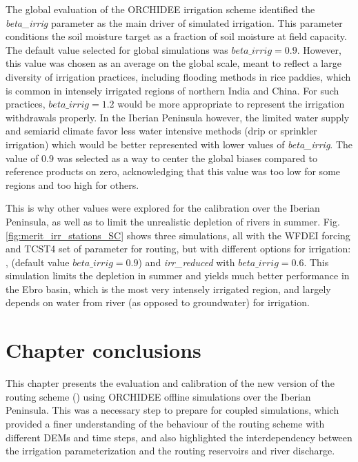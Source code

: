The global evaluation of the ORCHIDEE irrigation scheme \citep{arboleda-obando_validation_2024} identified the \textit{beta\_irrig} parameter as the main driver of simulated irrigation. This parameter conditions the soil moisture target as a fraction of soil moisture at field capacity. The default value selected for global simulations was $beta\_irrig = 0.9$. However, this value was chosen as an average on the global scale, meant to reflect a large diversity of irrigation practices, including flooding methods in rice paddies, which is common in intensely irrigated regions of northern India and China. For such practices, $beta\_irrig = 1.2$ would be more appropriate to represent the irrigation withdrawals properly. In the Iberian Peninsula however, the limited water supply and semiarid climate favor less water intensive methods (drip or sprinkler irrigation) which would be better represented with lower values of \textit{beta\_irrig}. The value of $0.9$ was selected as a way to center the global biases compared to reference products on zero, acknowledging that this value was too low for some regions and too high for others.

This is why other values were explored for the calibration over the Iberian Peninsula, as well as to limit the unrealistic depletion of rivers in summer. Fig. \ref{fig:merit_irr_stations_SC} shows three simulations, all with the WFDEI forcing and TCST4 set of parameter for routing, but with different options for irrigation: \noirr, \irr (default value $beta\_irrig = 0.9$) and \textit{irr\_reduced} with $beta\_irrig = 0.6$. 
This simulation limits the depletion in summer and yields much better performance in the Ebro basin, which is the most very intensely irrigated region, and largely depends on water from river (as opposed to groundwater) for irrigation.

\pagebreak
\section{Chapter conclusions}

This chapter presents the evaluation and calibration of the new version of the routing scheme (\native) using ORCHIDEE offline simulations  over the Iberian Peninsula. This was a necessary step to prepare for coupled simulations, which provided a finer understanding of the behaviour of the routing scheme with different DEMs and time steps, and also highlighted the interdependency between the irrigation parameterization and the routing reservoirs and river discharge. 

